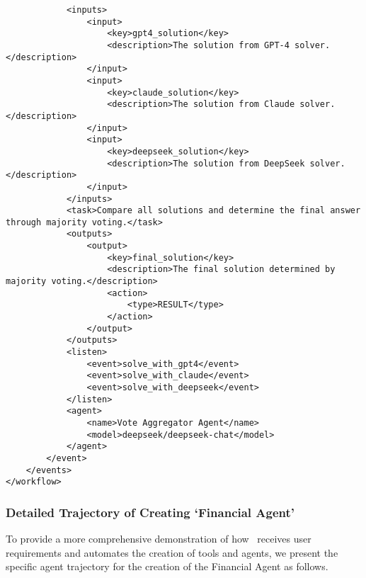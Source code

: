 \begin{lstlisting}
            <inputs>
                <input>
                    <key>gpt4_solution</key>
                    <description>The solution from GPT-4 solver.</description>
                </input>
                <input>
                    <key>claude_solution</key>
                    <description>The solution from Claude solver.</description>
                </input>
                <input>
                    <key>deepseek_solution</key>
                    <description>The solution from DeepSeek solver.</description>
                </input>
            </inputs>
            <task>Compare all solutions and determine the final answer through majority voting.</task>
            <outputs>
                <output>
                    <key>final_solution</key>
                    <description>The final solution determined by majority voting.</description>
                    <action>
                        <type>RESULT</type>
                    </action>
                </output>
            </outputs>
            <listen>
                <event>solve_with_gpt4</event>
                <event>solve_with_claude</event>
                <event>solve_with_deepseek</event>
            </listen>
            <agent>
                <name>Vote Aggregator Agent</name>
                <model>deepseek/deepseek-chat</model>
            </agent>
        </event>
    </events>
</workflow>
\end{lstlisting}


\subsubsection{Detailed Trajectory of Creating `Financial Agent'}
To provide a more comprehensive demonstration of how \model\ receives user requirements and automates the creation of tools and agents, we present the specific agent trajectory for the creation of the Financial Agent as follows.


